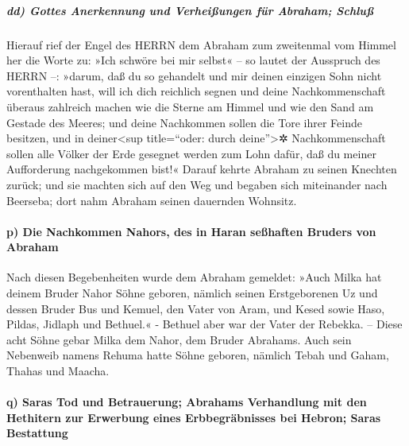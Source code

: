 \hypertarget{dd-gottes-anerkennung-und-verheiuxdfungen-fuxfcr-abraham-schluuxdf}{%
\subparagraph{dd) Gottes Anerkennung und Verheißungen für Abraham;
Schluß}\label{dd-gottes-anerkennung-und-verheiuxdfungen-fuxfcr-abraham-schluuxdf}}

 Hierauf rief der Engel des HERRN dem Abraham zum
zweitenmal vom Himmel her die Worte zu:  »Ich schwöre bei
mir selbst« -- so lautet der Ausspruch des HERRN --: »darum, daß du so
gehandelt und mir deinen einzigen Sohn nicht vorenthalten hast,
 will ich dich reichlich segnen und deine
Nachkommenschaft überaus zahlreich machen wie die Sterne am Himmel und
wie den Sand am Gestade des Meeres; und deine Nachkommen sollen die Tore
ihrer Feinde besitzen,  und in deiner\textless sup
title=``oder: durch deine''\textgreater✲ Nachkommenschaft sollen alle
Völker der Erde gesegnet werden zum Lohn dafür, daß du meiner
Aufforderung nachgekommen bist!«  Darauf kehrte Abraham
zu seinen Knechten zurück; und sie machten sich auf den Weg und begaben
sich miteinander nach Beerseba; dort nahm Abraham seinen dauernden
Wohnsitz.

\hypertarget{p-die-nachkommen-nahors-des-in-haran-seuxdfhaften-bruders-von-abraham}{%
\paragraph{p) Die Nachkommen Nahors, des in Haran seßhaften Bruders von
Abraham}\label{p-die-nachkommen-nahors-des-in-haran-seuxdfhaften-bruders-von-abraham}}

 Nach diesen Begebenheiten wurde dem Abraham gemeldet:
»Auch Milka hat deinem Bruder Nahor Söhne geboren, 
nämlich seinen Erstgeborenen Uz und dessen Bruder Bus und Kemuel, den
Vater von Aram,  und Kesed sowie Haso, Pildas, Jidlaph
und Bethuel.«  - Bethuel aber war der Vater der Rebekka.
-- Diese acht Söhne gebar Milka dem Nahor, dem Bruder Abrahams.
 Auch sein Nebenweib namens Rehuma hatte Söhne geboren,
nämlich Tebah und Gaham, Thahas und Maacha.

\hypertarget{q-saras-tod-und-betrauerung-abrahams-verhandlung-mit-den-hethitern-zur-erwerbung-eines-erbbegruxe4bnisses-bei-hebron-saras-bestattung}{%
\paragraph{q) Saras Tod und Betrauerung; Abrahams Verhandlung mit den
Hethitern zur Erwerbung eines Erbbegräbnisses bei Hebron; Saras
Bestattung}\label{q-saras-tod-und-betrauerung-abrahams-verhandlung-mit-den-hethitern-zur-erwerbung-eines-erbbegruxe4bnisses-bei-hebron-saras-bestattung}}

